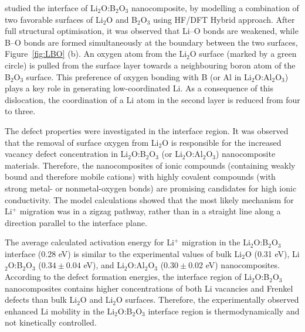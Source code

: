 \documentclass[../main.tex]{subfiles}
\begin{document}
\citeauthor{Rana-PRL-2007} studied the interface of Li$_2$O:B$_2$O$_3$ nanocomposite, by modelling a combination of two favorable surfaces of Li$_2$O and B$_2$O$_3$ using HF/DFT Hybrid approach.\cite{Rana-PRL-2007,Rana-JPCM-2012} After full structural optimisation, it was observed that Li--O bonds are weakened, while B--O bonds are formed simultaneously at the boundary between the two surfaces, Figure~\ref{fig:LBO} (b). An oxygen atom from the Li$_2$O surface (marked by a green circle) is pulled from the surface layer towards a neighbouring boron atom of the B$_2$O$_3$ surface. This preference of oxygen bonding with B (or Al in Li$_2$O:Al$_2$O$_3$) plays a key role in generating low-coordinated Li. As a consequence of this dislocation, the coordination of a Li atom in the second layer is reduced from four to three.

The defect properties were investigated in the interface region. It was observed that the removal of surface oxygen from Li$_2$O is responsible for the increased vacancy defect concentration in Li$_2$O:B$_2$O$_3$ (or Li$_2$O:Al$_2$O$_3$) nanocomposite materials. Therefore, the nanocomposites of ionic compounds (containing weakly bound and therefore mobile cations) with highly covalent compounds (with strong metal- or nonmetal-oxygen bonds) are promising candidates for high ionic conductivity. The model calculations showed that the most likely mechanism for Li$^+$ migration was in a zigzag pathway, rather than in a straight line along a direction parallel to the interface plane.

The average calculated activation energy for Li$^+$ migration in the Li$_2$O:B$_2$O$_3$ interface (0.28 eV)\cite{Rana-PRL-2007,Rana-JPCM-2012} is similar to the experimental values of bulk Li$_2$O (0.31 eV),\cite{Heitjans_2003} Li$_2$O:B$_2$O$_3$ ($0.34 \pm 0.04$ eV),\cite {Indris2002} and Li$_2$O:Al$_2$O$_3$ ($0.30 \pm 0.02$ eV)\cite{B300908D} nanocomposites. According to the defect formation energies, the interface region of Li$_2$O:B$_2$O$_3$ nanocomposites contains higher concentrations of both Li vacancies and Frenkel defects than bulk Li$_2$O and Li$_2$O surfaces.\cite{Rana-PRL-2007,Rana-JPCM-2012} Therefore, the experimentally observed enhanced Li mobility in the Li$_2$O:B$_2$O$_3$ interface region is thermodynamically and not kinetically controlled. \cite{Baggio2021,Claessen2009}
\end{document}
